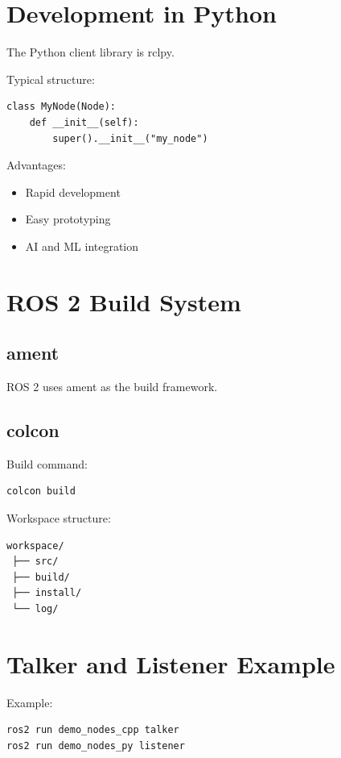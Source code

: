 \documentclass[11pt]{article}
\begin{document}
\section{Development in Python}

The Python client library is rclpy.

Typical structure:

\begin{verbatim}
class MyNode(Node):
    def __init__(self):
        super().__init__("my_node")
\end{verbatim}

Advantages:

\begin{itemize}
\item Rapid development
\item Easy prototyping
\item AI and ML integration
\end{itemize}

\section{ROS 2 Build System}

\subsection{ament}

ROS 2 uses ament as the build framework.

\subsection{colcon}

Build command:

\begin{verbatim}
colcon build
\end{verbatim}

Workspace structure:

\begin{verbatim}
workspace/
 ├── src/
 ├── build/
 ├── install/
 └── log/
\end{verbatim}

\section{Talker and Listener Example}

Example:

\begin{verbatim}
ros2 run demo_nodes_cpp talker
ros2 run demo_nodes_py listener
\end{verbatim}
\end{document}
